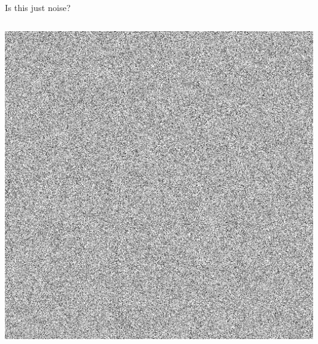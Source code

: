 \documentclass[11pt]{beamer}
\begin{document}
\begin{frame}{Is this just noise?}
\nointerlineskip%
\begin{columns}
\column{\dimexpr\paperwidth}
\centering
\includegraphics[width=.8\paperheight]{"eda1024"} 
\end{columns}
\end{frame}

\end{document}
